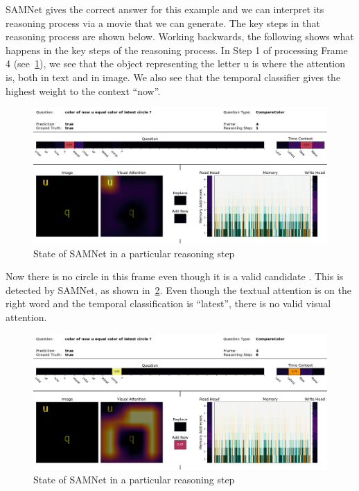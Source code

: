 SAMNet gives the correct answer for this example and we can interpret its reasoning process via a movie that we can generate.
The key steps in that reasoning process are shown below. Working backwards, the following shows what happens in the key steps
of the reasoning process.
In Step 1 of processing Frame 4 (see~\cref{fig:frame-4-step-1}), we see that the object representing the letter u is where the attention 
is, both in text and in image. We also see that the temporal classifier gives the highest weight to the context ``now''.
\begin{figure}[!h]
\centering
  \includegraphics[width=\textwidth]{"../img/visualization/sample 2/Frame 4 Step 1"}
\caption{State of SAMNet in a particular reasoning step} 
\label{fig:frame-4-step-1}
\end{figure}

Now there is no circle in this frame even though it is a valid candidate . This is detected by SAMNet,
as shown in~\cref{fig:frame-4-step-6}. Even though the textual attention is on the right word
and the temporal classification is ``latest'', there
is no valid visual attention.
\begin{figure}[!h]
	\centering
	\includegraphics[width=\textwidth]{"../img/visualization/sample 2/Frame 4 Step 6"}
	\caption{State of SAMNet in a particular reasoning step} 
	\label{fig:frame-4-step-6}
\end{figure}

